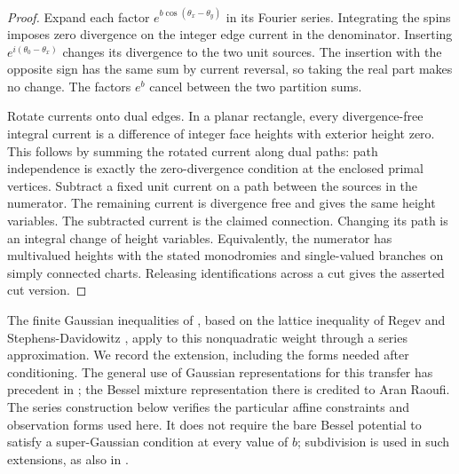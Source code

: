 \begin{proof}
Expand each factor \(e^{b\cos(\theta_x-\theta_y)}\) in its Fourier
series. Integrating the spins imposes zero divergence on the integer
edge current in the denominator. Inserting
\(e^{i(\theta_0-\theta_x)}\) changes its divergence to the two unit
sources. The insertion with the opposite sign has the same sum by
current reversal, so taking the real part makes no change.
The factors \(e^b\) cancel between the two partition sums.

Rotate currents onto dual edges. In a planar rectangle, every
divergence-free integral current is a difference of integer face
heights with exterior height zero. This follows by summing the
rotated current along dual paths: path independence is exactly the
zero-divergence condition at the enclosed primal vertices. Subtract
a fixed unit current on a path between the sources in the numerator.
The remaining current is divergence free and gives the same height
variables. The subtracted current is the claimed connection.
Changing its path is an integral change of height variables.
Equivalently, the numerator has multivalued heights with the stated
monodromies and single-valued branches on simply connected charts.
Releasing identifications across a cut gives the asserted cut version.
\end{proof}

The finite Gaussian inequalities of ,
based on the lattice inequality of Regev and
Stephens-Davidowitz \cite{RSD}, apply to this nonquadratic weight
through a series approximation. We record the extension, including
the forms needed after conditioning.
The general use of Gaussian representations for this transfer
has precedent in \cite[Lemmas~9.6--9.7 and Appendices~C--D]{AHPS2022};
the Bessel mixture representation there is credited to Aran Raoufi.
The series construction below verifies the particular affine
constraints and observation forms used here. It does not require
the bare Bessel potential to satisfy a super-Gaussian condition
at every value of \(b\); subdivision is used in such
extensions, as also in \cite[Theorem~8 and Section~1.3.3]{LammersDichotomy2026}.

